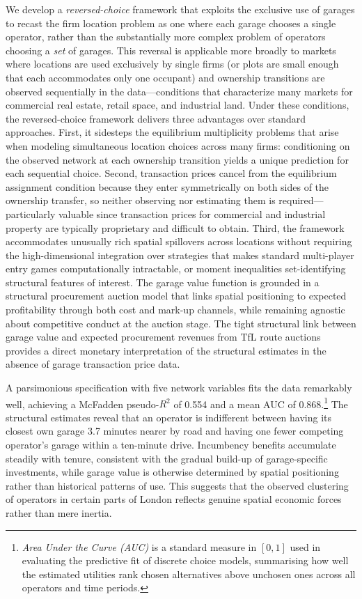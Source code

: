 \documentclass[12pt]{article}
\begin{document}
We develop a \emph{reversed-choice} framework that exploits the exclusive 
use of garages to recast the firm location problem as one where each garage 
chooses a single operator, rather than the substantially more complex problem of operators choosing a \emph{set} of garages. This reversal 
is applicable more broadly to markets where locations are used exclusively 
by single firms (or plots are small enough that each accommodates only one 
occupant) and ownership transitions are observed sequentially in the 
data---conditions that characterize many markets for commercial real estate, 
retail space, and industrial land. Under these conditions, the reversed-choice 
framework delivers three advantages over standard approaches. First, it 
sidesteps the equilibrium multiplicity problems that arise when modeling 
simultaneous location choices across many firms: conditioning on the observed 
network at each ownership transition yields a unique prediction for each 
sequential choice. Second, transaction prices cancel from the 
equilibrium assignment condition because they enter symmetrically on both 
sides of the ownership transfer, so neither observing nor estimating them 
is required---particularly valuable since transaction prices for commercial 
and industrial property are typically proprietary and difficult to obtain. 
Third, the framework accommodates unusually rich spatial spillovers across 
locations without requiring the high-dimensional integration over strategies 
that makes standard multi-player entry games computationally intractable, or moment inequalities set-identifying structural features of interest. 
The garage value function is grounded in a structural procurement auction 
model that links spatial positioning to expected profitability through both 
cost and mark-up channels, while remaining agnostic about competitive 
conduct at the auction stage. The tight structural link between garage value 
and expected procurement revenues from TfL route auctions provides a direct 
monetary interpretation of the structural estimates in the absence of garage transaction price data. 

A parsimonious specification with five network variables fits the data 
remarkably well, achieving a McFadden pseudo-$R^2$ of 0.554 and a mean AUC
of 0.868.\footnote{\emph{Area Under the Curve (AUC)} is a standard measure in $[0,1]$ used in evaluating the predictive fit of discrete choice models, summarising how well the estimated utilities rank chosen alternatives above unchosen ones across all operators and time periods.} The structural estimates reveal that an operator is indifferent 
between having its closest own garage 3.7 minutes nearer by road and having 
one fewer competing operator's garage within a ten-minute drive. Incumbency 
benefits accumulate steadily with tenure, consistent with the gradual 
build-up of garage-specific investments, while garage value is otherwise 
determined by spatial positioning rather than historical patterns of use. 
This suggests that the observed clustering of operators in certain parts of 
London reflects genuine spatial economic forces rather than mere inertia.
\end{document}

